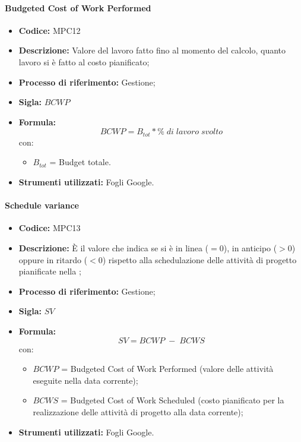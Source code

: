 \paragraph{Budgeted Cost of Work Performed}
\begin{itemize}
	\item \textbf{Codice:} MPC12
	\item \textbf{Descrizione:} Valore del lavoro fatto fino al momento del calcolo, quanto lavoro si è fatto al costo pianificato;
	\item \textbf{Processo di riferimento:} Gestione;
	\item \textbf{Sigla:} $BCWP$
	\item \textbf{Formula:} $$BCWP = {B_{tot} * \% \;di\; lavoro\; svolto}$$
	con:
	\begin{itemize}
		\item $B_{tot}$ = Budget totale.
	\end{itemize}
	\item \textbf{Strumenti utilizzati:} Fogli Google.
\end{itemize}

\paragraph{Schedule variance}
\begin{itemize}
	\item \textbf{Codice:} MPC13
	\item \textbf{Descrizione:} È il valore che indica se si è in linea ($=0$), in anticipo ($>0$) oppure in ritardo ($<0$) rispetto alla schedulazione delle attività di progetto pianificate nella ;
	\item \textbf{Processo di riferimento:} Gestione;
	\item \textbf{Sigla:} $SV$
	\item \textbf{Formula:} $$SV = {BCWP \; - \; BCWS}$$
	con:
	\begin{itemize}
		\item $BCWP$ = Budgeted Cost of Work Performed (valore delle attività eseguite nella data corrente);
		\item $BCWS$ = Budgeted Cost of Work Scheduled (costo pianificato per la realizzazione delle attività di progetto alla data corrente);
	\end{itemize}
	\item \textbf{Strumenti utilizzati:} Fogli Google.
\end{itemize}

